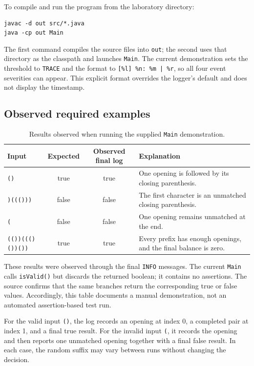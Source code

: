 \documentclass[12pt,a4paper]{article}
\newcommand{\code}[1]{\texttt{#1}}
\begin{document}
\begin{samepage}
To compile and run the program from the laboratory directory:
\begin{lstlisting}[language={},basicstyle=\ttfamily\small]
javac -d out src/*.java
java -cp out Main
\end{lstlisting}
\end{samepage}
The first command compiles the source files into \code{out}; the second uses that directory as the classpath and launches \code{Main}. The current demonstration sets the threshold to \code{TRACE} and the format to \code{[\%l] \%n: \%m | \%r}, so all four event severities can appear. This explicit format overrides the logger's default and does not display the timestamp.

\subsection{Observed required examples}
\begin{table}[H]
\centering\small
\begin{tabularx}{\textwidth}{@{}p{}ccY@{}}
\toprule
\textbf{Input} & \textbf{Expected} & \textbf{Observed final log} & \textbf{Explanation}\\
\midrule
\code{()} & true & true & One opening is followed by its closing parenthesis.\\
\code{)((()))} & false & false & The first character is an unmatched closing parenthesis.\\
\code{(} & false & false & One opening remains unmatched at the end.\\
\code{(())((()())())} & true & true & Every prefix has enough openings, and the final balance is zero.\\
\bottomrule
\end{tabularx}
\caption{Results observed when running the supplied \code{Main} demonstration.}
\end{table}

These results were observed through the final \code{INFO} messages. The current \code{Main} calls \code{isValid()} but discards the returned boolean; it contains no assertions. The source confirms that the same branches return the corresponding true or false values. Accordingly, this table documents a manual demonstration, not an automated assertion-based test run.

For the valid input \code{()}, the log records an opening at index 0, a completed pair at index 1, and a final true result. For the invalid input \code{(}, it records the opening and then reports one unmatched opening together with a final false result. In each case, the random suffix may vary between runs without changing the decision.
\end{document}
